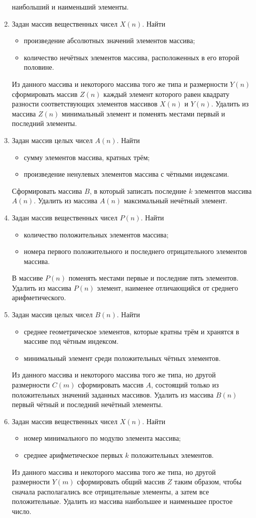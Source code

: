 \begin{enumerate}
наибольший и наименьший элементы.
\item Задан массив вещественных чисел $X(n)$. Найти
\begin{itemize}
\item произведение абсолютных значений элементов массива;
\item количество нечётных элементов массива, расположенных в его второй половине.
\end{itemize}
Из данного массива и некоторого массива того же типа и размерности $Y(n)$ сформировать
массив $Z(n)$ каждый элемент которого равен квадрату разности соответствующих элементов
массивов $X(n)$ и $Y(n)$. Удалить из массива
$Z(n)$ минимальный элемент и поменять местами первый и последний элементы.
\item Задан массив целых чисел $A(n)$. Найти
\begin{itemize}
\item сумму элементов массива, кратных трём;
\item произведение ненулевых элементов массива с чётными индексами.
\end{itemize}
Сформировать массива $B$, в который записать последние $k$ элементов массива
$A(n)$. Удалить из массива $A(n)$ максимальный нечётный элемент.
\item Задан массив вещественных чисел $P(n)$. Найти
\begin{itemize}
\item количество положительных элементов массива;
\item номера первого положительного и последнего отрицательного элементов массива.
\end{itemize}
В массиве $P(n)$ поменять местами первые и последние пять элементов. Удалить из массива
$P(n)$ элемент, наименее отличающийся от среднего арифметического.
\item Задан массив целых чисел $B(n)$. Найти
\begin{itemize}
\item среднее геометрическое элементов, которые кратны трём и хранятся в массиве под чётным индексом.
\item минимальный элемент среди положительных чётных элементов.
\end{itemize}
Из данного массива и некоторого массива того же типа, но другой размерности $C(m)$
сформировать массив $A$, состоящий только из положительных значений заданных массивов. Удалить из
массива $B(n)$ первый чётный и последний нечётный элементы.
\item Задан массив вещественных чисел $X(n)$. Найти
\begin{itemize}
\item номер минимального по модулю элемента массива;
\item среднее арифметическое первых $k$ положительных элементов.
\end{itemize}
Из данного массива и некоторого массива того же типа, но другой размерности $Y(m)$
сформировать общий массив $Z$ таким образом, чтобы сначала располагались все отрицательные элементы, а
затем все положительные. Удалить из массива наибольшее и наименьшее простое число.
\end{enumerate}

